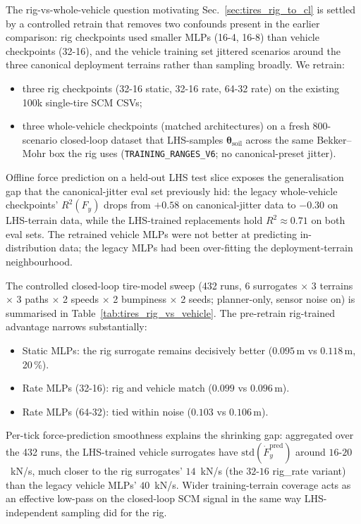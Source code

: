 \documentclass[conference,letterpaper,10pt]{IEEEtran}
\begin{document}
The rig-vs-whole-vehicle question motivating
Sec.~\ref{sec:tires_rig_to_cl} is settled by a controlled retrain
that removes two confounds present in the earlier comparison: rig
checkpoints used smaller MLPs (16-4, 16-8) than vehicle checkpoints
(32-16), and the vehicle training set jittered scenarios around the
three canonical deployment terrains rather than sampling broadly. We
retrain:

\begin{itemize}
\item three rig checkpoints (32-16 static, 32-16 rate, 64-32 rate) on
  the existing 100k single-tire SCM CSVs;
\item three whole-vehicle checkpoints (matched architectures) on a
  fresh 800-scenario closed-loop dataset that LHS-samples
  $\boldsymbol\theta_{\mathrm{soil}}$ across the same Bekker--Mohr box
  the rig uses (\texttt{TRAINING\_RANGES\_V6}; no canonical-preset
  jitter).
\end{itemize}

Offline force prediction on a held-out LHS test slice exposes the
generalisation gap that the canonical-jitter eval set previously
hid: the legacy whole-vehicle checkpoints' $R^2(F_y)$ drops from
$+0.58$ on canonical-jitter data to $-0.30$ on LHS-terrain data,
while the LHS-trained replacements hold $R^2 \approx 0.71$ on both
eval sets. The retrained vehicle MLPs were not better at predicting
in-distribution data; the legacy MLPs had been over-fitting the
deployment-terrain neighbourhood.

The controlled closed-loop tire-model sweep (432 runs, 6 surrogates
$\times$ 3 terrains $\times$ 3 paths $\times$ 2 speeds $\times$ 2
bumpiness $\times$ 2 seeds; planner-only, sensor noise on) is
summarised in Table~\ref{tab:tires_rig_vs_vehicle}. The pre-retrain
rig-trained advantage narrows substantially:

\begin{itemize}
\item Static MLPs: the rig surrogate remains decisively better
  ($0.095\,\mathrm{m}$ vs $0.118\,\mathrm{m}$, 20\,\%).
\item Rate MLPs (32-16): rig and vehicle match
  ($0.099$ vs $0.096\,\mathrm{m}$).
\item Rate MLPs (64-32): tied within noise
  ($0.103$ vs $0.106\,\mathrm{m}$).
\end{itemize}

Per-tick force-prediction smoothness explains the shrinking gap:
aggregated over the 432 runs, the LHS-trained vehicle surrogates have
$\mathrm{std}(\dot F_y^{\mathrm{pred}})$ around $16$-$20$~kN/s, much
closer to the rig surrogates' $14$~kN/s (the $32$-$16$ rig\_rate
variant) than the legacy vehicle MLPs' $40$~kN/s. Wider
training-terrain coverage acts as an effective low-pass on the
closed-loop SCM signal in the same way LHS-independent sampling did
for the rig.
\end{document}
